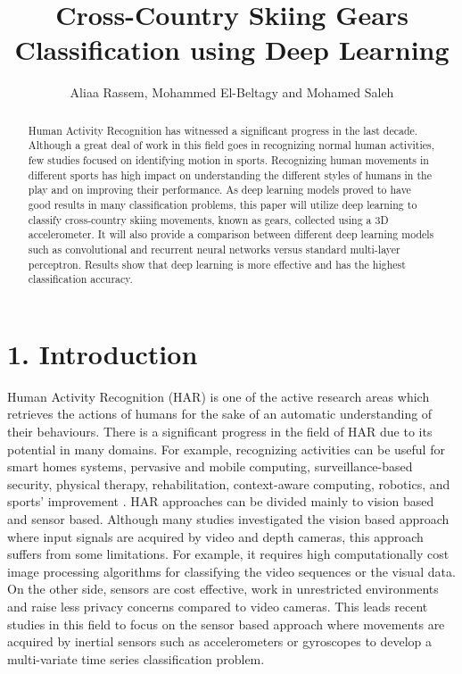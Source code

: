 \documentclass[12pt,a4paper]{article}
\title{\textbf{Cross-Country Skiing Gears Classification using Deep Learning}}
\author{Aliaa Rassem, Mohammed El-Beltagy and Mohamed Saleh}
\date{}
\begin{document}
\maketitle

\begin{abstract}
Human Activity Recognition has witnessed a significant progress in the last decade. Although a great deal of work in this field goes in recognizing normal human activities, few studies focused on identifying motion in sports. Recognizing human movements in different sports has high impact on understanding the different styles of humans in the play and on improving their performance. As deep learning models proved to have good results in many classification problems, this paper will utilize deep learning to classify cross-country skiing movements, known as gears, collected using a 3D accelerometer. It will also provide a comparison between different deep learning models such as convolutional and recurrent neural networks versus standard multi-layer perceptron. Results show that deep learning is more effective and has the highest classification accuracy.
\end{abstract}



\section*{1. Introduction}
Human Activity Recognition (HAR) is one of the active research areas which retrieves the actions of humans for the sake of an automatic understanding of their behaviours. There is a significant progress in the field of HAR due to its potential in many domains. For example, recognizing activities can be useful for smart homes systems, pervasive and mobile computing,  surveillance-based security, physical therapy, rehabilitation, context-aware computing, robotics, and sports' improvement \cite{chen2015survey}. HAR approaches can be divided mainly to vision based and sensor based. Although many studies investigated the vision based approach where input signals are acquired by video and depth cameras, this approach suffers from some limitations. For example, it requires high computationally cost image processing algorithms for classifying the video sequences or the visual data. On the other side, sensors are cost effective,  work in unrestricted environments and raise less privacy concerns compared to video cameras. This leads recent studies in this field to focus on the sensor based approach where movements are acquired by inertial sensors such as accelerometers or gyroscopes  to develop a multi-variate time series classification problem. 
\end{document}
